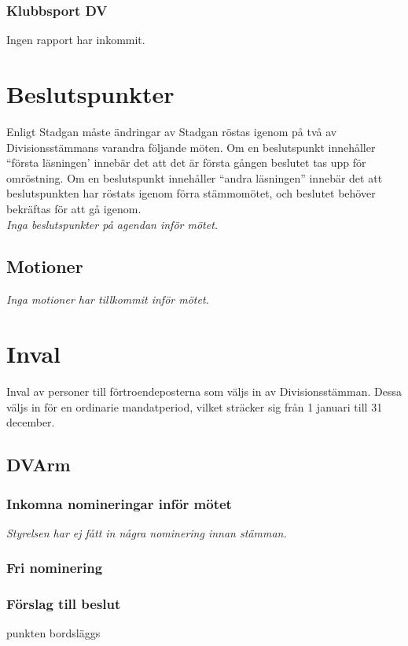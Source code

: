 \documentclass[protokoll]{dvd}
\begin{document}
\subsubsection*{Klubbsport DV}
Ingen rapport har inkommit.


\section{Beslutspunkter}

Enligt Stadgan måste ändringar av Stadgan röstas igenom på två av Divisionsstämmans varandra följande möten.
Om en beslutspunkt innehåller ``första läsningen' innebär det att det är första gången beslutet tas upp för omröstning.
Om en beslutspunkt innehåller ``andra läsningen'' innebär det att beslutspunkten har röstats igenom förra stämmomötet, och beslutet behöver bekräftas för att gå igenom.
\\
\textit{Inga beslutspunkter på agendan inför mötet. }


\subsection*{Motioner}
\textit{Inga motioner har tillkommit inför mötet.}



\section{Inval}
Inval av personer till förtroendeposterna som väljs in av Divisionsstämman. Dessa väljs in för en ordinarie mandatperiod, vilket sträcker sig från 1 januari till 31 december.

\subsection*{DVArm}
\subsubsection*{Inkomna nomineringar inför mötet}
\textit{Styrelsen har ej fått in några nominering innan stämman.}
\subsubsection*{Fri nominering}
\subsubsection*{Förslag till beslut}
\begin{attsatser}
    \item punkten bordsläggs
\end{attsatser}
\end{document}
